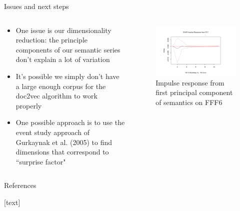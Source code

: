 \documentclass[9pt]{beamer}
\begin{document}
	\begin{frame}{Issues and next steps}
		\begin{columns}
			\begin{column}{0.48\textwidth}
				\begin{itemize}
					\item One issue is our dimensionality reduction: the principle components of our semantic series don't explain a lot of variation

					\item It's possible we simply don't have a large enough corpus for the doc2vec algorithm to work properly
					\item One possible approach is to use the event study approach of Gurkaynak et al. (2005) to find dimensions that correspond to ``surprise factor"
				\end{itemize}
			\end{column}
			\begin{column}{0.5\textwidth}
				\begin{figure}
					\includegraphics[width=\textwidth]{augmentedimpulse.png}
					\caption{Impulse response from first principal component of semantics on FFF6}
				\end{figure}
			\end{column}
		\end{columns}
	\end{frame}
	
	\begin{frame}{References}
		
\nocite{gurkaynak2005actions}
\nocite{campbell2012macroeconomic}
\nocite{le2014distributed}
\nocite{mikolov2013efficient}
\nocite{bernanke2005measuring}

[text]


		
	\end{frame}
	
\end{document}
